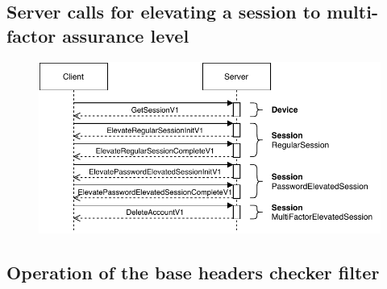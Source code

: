 \subsection{Server calls for elevating a session to multi-factor assurance level}

\begin{figure}[!htb]
    \includegraphics[width=\textwidth]{figures/elevate-to-mfa-session.pdf}
\end{figure}

\newpage

\subsection{Operation of the base headers checker filter}

